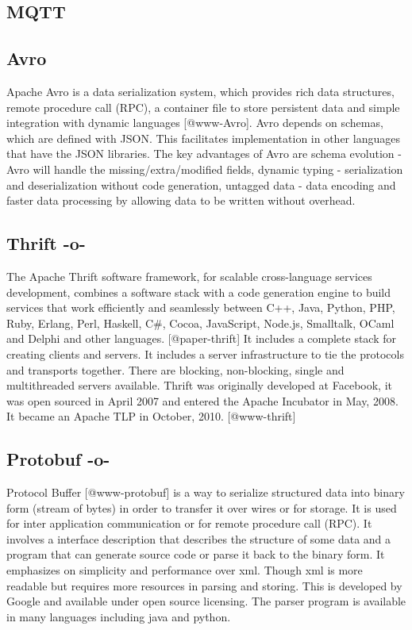 \subsection{MQTT}

\subsection{Avro}

Apache Avro is a data serialization system, which provides rich data
structures, remote procedure call (RPC), a container file to store
persistent data and simple integration with dynamic
languages [@www-Avro].  Avro depends on schemas, which are defined
with JSON. This facilitates implementation in other languages that
have the JSON libraries.  The key advantages of Avro are schema
evolution - Avro will handle the missing/extra/modified fields,
dynamic typing - serialization and deserialization without code
generation, untagged data - data encoding and faster data processing
by allowing data to be written without overhead.
     
\subsection{Thrift -o-}

The Apache Thrift software framework, for scalable cross-language
services development, combines a software stack with a code generation
engine to build services that work efficiently and seamlessly between
C++, Java, Python, PHP, Ruby, Erlang, Perl, Haskell, C\#, Cocoa,
JavaScript, Node.js, Smalltalk, OCaml and Delphi and other
languages. [@paper-thrift] It includes a complete stack for
creating clients and servers. It includes a server infrastructure to
tie the protocols and transports together. There are blocking,
non-blocking, single and multithreaded servers available.  Thrift was
originally developed at Facebook, it was open sourced in April 2007
and entered the Apache Incubator in May, 2008. It became an Apache TLP
in October, 2010. [@www-thrift]
     
\subsection{Protobuf -o-}

Protocol Buffer [@www-protobuf] is a way to serialize structured
data into binary form (stream of bytes) in order to transfer it over
wires or for storage. It is used for inter application communication
or for remote procedure call (RPC). It involves a interface
description that describes the structure of some data and a program
that can generate source code or parse it back to the binary form. It
emphasizes on simplicity and performance over xml. Though xml is more
readable but requires more resources in parsing and storing.  This is
developed by Google and available under open source licensing. The
parser program is available in many languages including java and
python.



